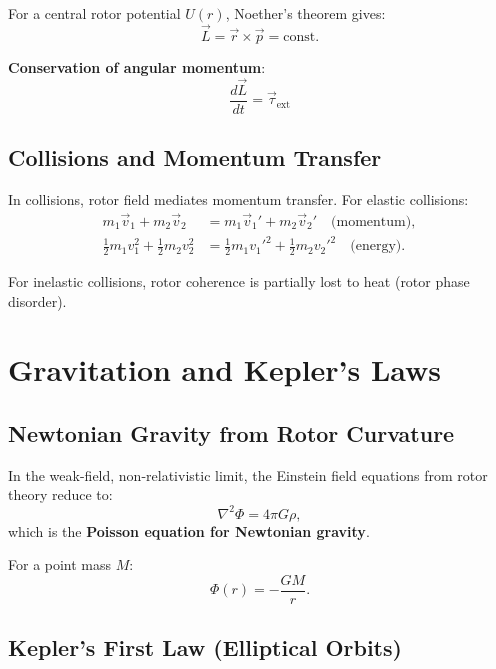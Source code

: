 \documentclass[12pt,a4paper]{article}
\theoremstyle{definition}
\theoremstyle{remark}
\begin{document}
For a central rotor potential $U(r)$, Noether's theorem gives:
\begin{equation}
\vec{L} = \vec{r} \times \vec{p} = \text{const}.
\end{equation}

\textbf{Conservation of angular momentum}:
\begin{equation}
\boxed{\frac{d\vec{L}}{dt} = \vec{\tau}_{\text{ext}}}
\end{equation}

\subsection{Collisions and Momentum Transfer}

In collisions, rotor field mediates momentum transfer. For elastic collisions:
\begin{align}
m_1 \vec{v}_1 + m_2 \vec{v}_2 &= m_1 \vec{v}_1' + m_2 \vec{v}_2' \quad \text{(momentum)}, \\
\frac{1}{2}m_1 v_1^2 + \frac{1}{2}m_2 v_2^2 &= \frac{1}{2}m_1 v_1'^2 + \frac{1}{2}m_2 v_2'^2 \quad \text{(energy)}.
\end{align}

For inelastic collisions, rotor coherence is partially lost to heat (rotor phase disorder).

\section{Gravitation and Kepler's Laws}

\subsection{Newtonian Gravity from Rotor Curvature}

In the weak-field, non-relativistic limit, the Einstein field equations from rotor theory reduce to:
\begin{equation}
\nabla^2 \Phi = 4\pi G \rho,
\end{equation}
which is the \textbf{Poisson equation for Newtonian gravity}.

For a point mass $M$:
\begin{equation}
\Phi(r) = -\frac{GM}{r}.
\end{equation}

\subsection{Kepler's First Law (Elliptical Orbits)}
\end{document}
